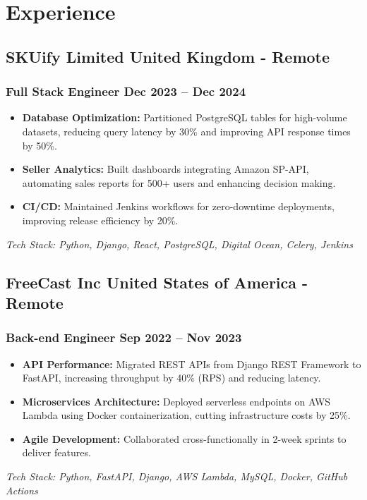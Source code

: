 \documentclass[11pt]{article} %
\newcommand \techstack [1]
    {\small\textit{Tech Stack: {#1}}} %
\begin{document}
\section{Experience}

\subsection{SKUify Limited \hfill United Kingdom - Remote}
\subsubsection{Full Stack Engineer \hfill  Dec 2023 -- Dec 2024}
\begin{itemize}
    \item \textbf{Database Optimization:} Partitioned PostgreSQL tables for high-volume datasets, reducing query latency by 30\% and improving API response times by 50\%.
    \item \textbf{Seller Analytics:} Built dashboards integrating Amazon SP-API, automating sales reports for 500+ users and enhancing decision making.
    \item \textbf{CI/CD:} Maintained Jenkins workflows for zero-downtime deployments, improving release efficiency by 20\%.
\end{itemize}
\techstack{Python, Django, React, PostgreSQL, Digital Ocean, Celery, Jenkins}
\vspace{0.8em}

\subsection{FreeCast Inc \hfill United States of America - Remote}
\subsubsection{Back-end Engineer \hfill  Sep 2022 -- Nov 2023}
\begin{itemize}
    \item \textbf {API Performance:} Migrated REST APIs from Django REST Framework to FastAPI, increasing throughput by 40\% (RPS) and reducing latency.
    \item \textbf {Microservices Architecture:} Deployed serverless endpoints on AWS Lambda using Docker containerization, cutting infrastructure costs by 25\%.
    \item \textbf {Agile Development:} Collaborated cross-functionally in 2-week sprints to deliver features.
\end{itemize}
\techstack{Python, FastAPI, Django, AWS Lambda, MySQL, Docker, GitHub Actions}
\vspace{0.8em}
\end{document}
